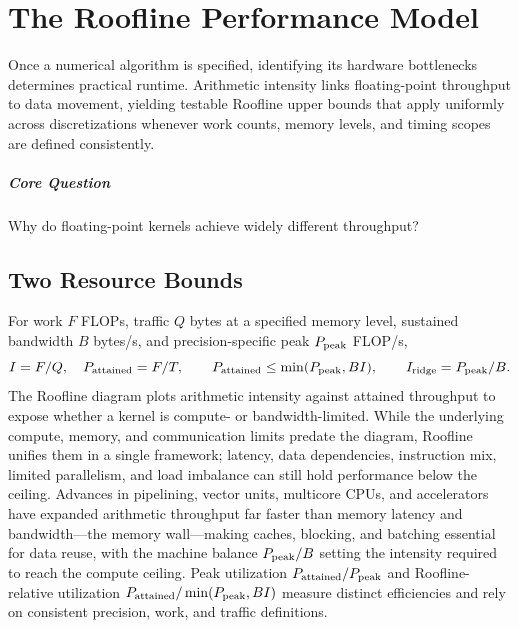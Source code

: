 \chapter{The Roofline Performance Model}\label{v0ch:22}
\begin{chaptersummary}
Once a numerical algorithm is specified, identifying its hardware bottlenecks determines practical runtime. Arithmetic intensity links floating-point throughput to data movement, yielding testable Roofline upper bounds that apply uniformly across discretizations whenever work counts, memory levels, and timing scopes are defined consistently.
\end{chaptersummary}
\paragraph{Core Question}Why do floating-point kernels achieve widely different throughput?

\section{Two Resource Bounds}
For work $F$ FLOPs, traffic $Q$ bytes at a specified memory level, sustained bandwidth $B$ bytes/s, and precision-specific peak $P_{\rm peak}$ FLOP/s,
\[
 I=F/Q,\quad P_{\rm attained}=F/T,\qquad
 P_{\rm attained}\le\min(P_{\rm peak},BI),\qquad
 I_{\rm ridge}=P_{\rm peak}/B.
\]
The Roofline diagram plots arithmetic intensity against attained throughput to expose whether a kernel is compute- or bandwidth-limited.\cite{roofline}
While the underlying compute, memory, and communication limits predate the diagram, Roofline unifies them in a single framework; latency, data dependencies, instruction mix, limited parallelism, and load imbalance can still hold performance below the ceiling.
Advances in pipelining, vector units, multicore CPUs, and accelerators have expanded arithmetic throughput far faster than memory latency and bandwidth—the memory wall—making caches, blocking, and batching essential for data reuse, with the machine balance $P_{\rm peak}/B$ setting the intensity required to reach the compute ceiling.\cite{architecture}
Peak utilization $P_{\rm attained}/P_{\rm peak}$ and Roofline-relative utilization $P_{\rm attained}/\min(P_{\rm peak},BI)$ measure distinct efficiencies and rely on consistent precision, work, and traffic definitions.
